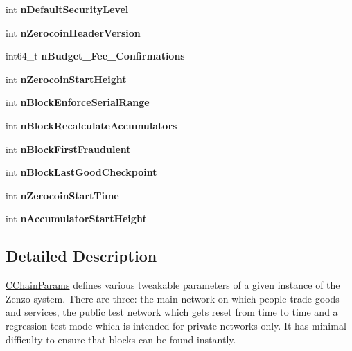 \begin{DoxyCompactItemize}
\item 
\mbox{\label{class_c_chain_params_a9d1590c701c4ba85601ced386103e2cc}} 
int {\bfseries n\+Default\+Security\+Level}
\item 
\mbox{\label{class_c_chain_params_acc2851a966d3668c09bfdbea7bb5de96}} 
int {\bfseries n\+Zerocoin\+Header\+Version}
\item 
\mbox{\label{class_c_chain_params_a1bc99b0b408a74f8946a220c5feb5b0c}} 
int64\+\_\+t {\bfseries n\+Budget\+\_\+\+Fee\+\_\+\+Confirmations}
\item 
\mbox{\label{class_c_chain_params_aca752e6cd13e695d2f679fed05ce15a6}} 
int {\bfseries n\+Zerocoin\+Start\+Height}
\item 
\mbox{\label{class_c_chain_params_a52246ab367decc6365b4ca07f1502a9e}} 
int {\bfseries n\+Block\+Enforce\+Serial\+Range}
\item 
\mbox{\label{class_c_chain_params_a0f1c3b37309c7df072a82aaa94010fe3}} 
int {\bfseries n\+Block\+Recalculate\+Accumulators}
\item 
\mbox{\label{class_c_chain_params_afa3d076eba27a08e2163e4763d91e02f}} 
int {\bfseries n\+Block\+First\+Fraudulent}
\item 
\mbox{\label{class_c_chain_params_a054fbf57da6d3f8f042093b07e79b13d}} 
int {\bfseries n\+Block\+Last\+Good\+Checkpoint}
\item 
\mbox{\label{class_c_chain_params_a1ece3e405b68957ccc0b8269d4f1c99f}} 
int {\bfseries n\+Zerocoin\+Start\+Time}
\item 
\mbox{\label{class_c_chain_params_a9c6a1020d3bab9a668e06f6b36f927ae}} 
int {\bfseries n\+Accumulator\+Start\+Height}
\end{DoxyCompactItemize}


\subsection{Detailed Description}
\mbox{\hyperlink{class_c_chain_params}{C\+Chain\+Params}} defines various tweakable parameters of a given instance of the Zenzo system. There are three\+: the main network on which people trade goods and services, the public test network which gets reset from time to time and a regression test mode which is intended for private networks only. It has minimal difficulty to ensure that blocks can be found instantly. 

